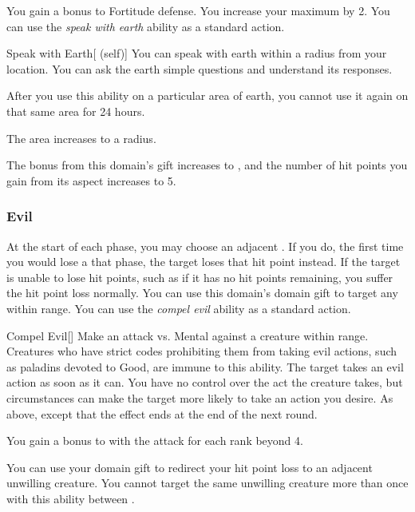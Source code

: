              You gain a  bonus to Fortitude defense.
             You increase your maximum  by 2.
             You can use the \textit{speak with earth} ability as a standard action.
            \begin{attuneability}{Speak with Earth}[ (self)]
                You can speak with earth within a \areahuge radius  from your location.
                You can ask the earth simple questions and understand its responses.

                After you use this ability on a particular area of earth, you cannot use it again on that same area for 24 hours.

                \rankline
                 The area increases to a \areagarg radius.
            \end{attuneability}
             The bonus from this domain's gift increases to , and the number of hit points you gain from its aspect increases to 5.

        \subsubsection{Evil}
             At the start of each phase, you may choose an adjacent .
            If you do, the first time you would lose a  that phase, the target loses that hit point instead.
            If the target is unable to lose hit points, such as if it has no hit points remaining, you suffer the hit point loss normally.
             You can use this domain's domain gift to target any  within \rngmed range.
             You can use the \textit{compel evil} ability as a standard action.
            \begin{freeability}{Compel Evil}[]
                Make an attack vs. Mental against a creature within \rngmed range.
                Creatures who have strict codes prohibiting them from taking evil actions, such as paladins devoted to Good, are immune to this ability.
                \hit The target takes an evil action as soon as it can.
                You have no control over the act the creature takes, but circumstances can make the target more likely to take an action you desire.
                \glance As above, except that the effect ends at the end of the next round.

                \rankline
                You gain a  bonus to  with the attack for each rank beyond 4.
            \end{freeability}
             You can use your domain gift to redirect your hit point loss to an adjacent unwilling creature.
            You cannot target the same unwilling creature more than once with this ability between .

